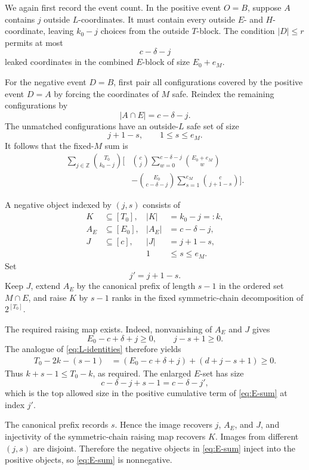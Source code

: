 \documentclass[11pt]{article}
\newcommand{\1}{\mathbf 1}
\begin{document}
We again first record the event count.  In the positive event $O=B$,
suppose $A$ contains $j$ outside $L$-coordinates.  It must contain
every outside $E$- and $H$-coordinate, leaving $k_0-j$ choices from
the outside $T$-block.  The condition $|D|\leq r$ permits at most
\[
c-\delta-j
\]
leaked coordinates in the combined $E$-block of size $E_0+e_M$.

For the negative event $D=B$, first pair all configurations covered by
the positive event $D=A$ by forcing the coordinates of $M$ safe.
Reindex the remaining configurations by
\[
|A\cap E|=c-\delta-j.
\]
The unmatched configurations have an outside-$L$ safe set of size
\[
j+1-s,
\qquad
1\leq s\leq e_M.
\]
It follows that the fixed-$M$ sum is
\begin{equation}\label{eq:E-sum}
\begin{aligned}
\sum_{j\in\mathbb Z}\binom{T_0}{k_0-j}
\Bigg[
&\binom cj\sum_{w=0}^{c-\delta-j}\binom{E_0+e_M}{w}\\
&-\binom{E_0}{c-\delta-j}
\sum_{s=1}^{e_M}\binom c{j+1-s}
\Bigg].
\end{aligned}
\end{equation}

A negative object indexed by $(j,s)$ consists of
\[
\begin{aligned}
K&\subseteq[T_0],& |K|&=k_0-j=:k,\\
A_E&\subseteq[E_0],& |A_E|&=c-\delta-j,\\
J&\subseteq[c],& |J|&=j+1-s,\\
&&1&\leq s\leq e_M.
\end{aligned}
\]
Set
\[
j'=j+1-s.
\]
Keep $J$, extend $A_E$ by the canonical prefix of length $s-1$ in
the ordered set $M\cap E$, and raise $K$ by $s-1$ ranks in the fixed
symmetric-chain decomposition of $2^{[T_0]}$.

The required raising map exists.  Indeed, nonvanishing of $A_E$ and
$J$ gives
\[
E_0-c+\delta+j\geq0,
\qquad
j-s+1\geq0.
\]
The analogue of \eqref{eq:L-identities} therefore yields
\begin{align}
T_0-2k-(s-1)
&=(E_0-c+\delta+j)+(d+j-s+1)\geq0.
\label{eq:E-raising-condition}
\end{align}
Thus $k+s-1\leq T_0-k$, as required.  The enlarged $E$-set has size
\[
c-\delta-j+s-1=c-\delta-j',
\]
which is the top allowed size in the positive cumulative term of
\eqref{eq:E-sum} at index $j'$.

The canonical prefix records $s$.  Hence the image recovers $j$,
$A_E$, and $J$, and injectivity of the symmetric-chain raising map
recovers $K$.  Images from different $(j,s)$ are disjoint.  Therefore
the negative objects in \eqref{eq:E-sum} inject into the positive
objects, so \eqref{eq:E-sum} is nonnegative.
\end{document}
